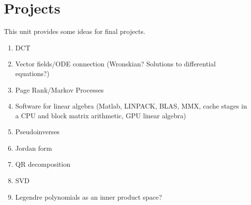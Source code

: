 \chapter{Projects}

This unit provides some ideas for final projects.

\begin{enumerate}
\item DCT
\item Vector fields/ODE connection (Wronskian?  Solutions to
  differential equations?)
\item Page Rank/Markov Processes
\item Software for linear algebra (Matlab, LINPACK, BLAS, MMX, cache
  stages in a CPU and block matrix arithmetic, GPU linear algebra)
\item Pseudoinverses
\item Jordan form
\item QR decomposition
\item SVD
\item Legendre polynomials as an inner product space?
\end{enumerate}


